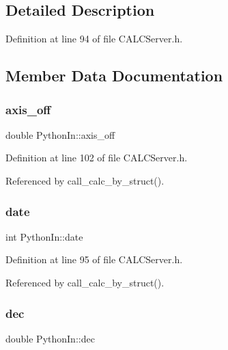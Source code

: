 \subsection{Detailed Description}


Definition at line 94 of file C\+A\+L\+C\+Server.\+h.



\subsection{Member Data Documentation}
\mbox{\label{struct_python_in_abe56c6bc95dd8aa5a0b0ef6d48f9de13}} 
\subsubsection{\texorpdfstring{axis\+\_\+off}{axis\_off}}
{\footnotesize\ttfamily double Python\+In\+::axis\+\_\+off}



Definition at line 102 of file C\+A\+L\+C\+Server.\+h.



Referenced by call\+\_\+calc\+\_\+by\+\_\+struct().

\mbox{\label{struct_python_in_add11f2b1d4e33b43e513d19348eb7d9e}} 
\subsubsection{\texorpdfstring{date}{date}}
{\footnotesize\ttfamily int Python\+In\+::date}



Definition at line 95 of file C\+A\+L\+C\+Server.\+h.



Referenced by call\+\_\+calc\+\_\+by\+\_\+struct().

\mbox{\label{struct_python_in_a92814fe3321bbc5e4162424fb67dcccd}} 
\subsubsection{\texorpdfstring{dec}{dec}}
{\footnotesize\ttfamily double Python\+In\+::dec}



